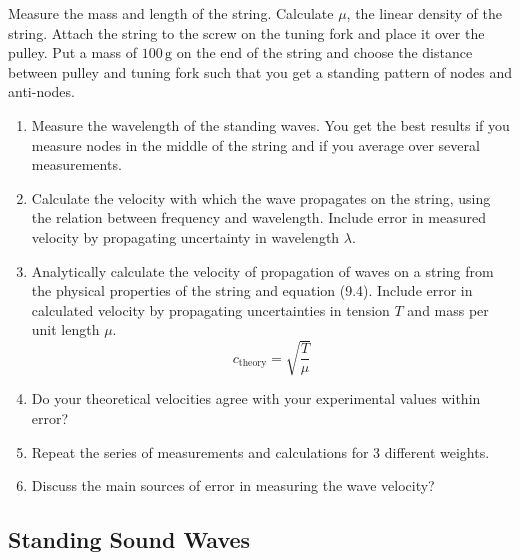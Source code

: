 Measure the mass and length of the string. Calculate $\mu$, the linear density of the string. Attach the string to the screw on the tuning fork and place it over the pulley. Put a mass of $100\, \textrm{g}$ on the end of the string and choose the distance between pulley and tuning fork such that you get a standing pattern of nodes and anti-nodes.
\begin{enumerate}
\item Measure the wavelength of the standing waves. You get the best results if you measure nodes in the middle of the string and if you average over several measurements.
\item Calculate the velocity with which the wave propagates on the string, using the relation between frequency and wavelength. Include error in measured velocity by propagating uncertainty in wavelength $\lambda$.
\item Analytically calculate the velocity of propagation of waves on a string from the physical properties of the string and equation (9.4). Include error in calculated velocity by propagating uncertainties in tension $T$ and mass per unit length $\mu$.
  \begin{equation}
    c_{\text{theory}}=\sqrt{\frac{T}{\mu}}
  \end{equation}

\item Do your theoretical velocities agree with your experimental values within error?
\item Repeat the series of measurements and calculations for 3 different weights.
\item Discuss the main sources of error in measuring the wave velocity?

\end{enumerate}

\subsection{Standing Sound Waves}

